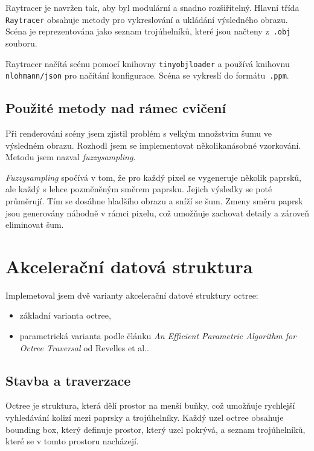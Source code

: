 \documentclass[10pt,a4paper,twocolumn]{article}
\begin{document}
Raytracer je navržen tak, aby byl modulární a snadno rozšiřitelný. Hlavní třída \texttt{Raytracer} obsahuje metody pro vykreslování a ukládání výsledného obrazu. Scéna je reprezentována jako seznam trojúhelníků, které jsou načteny z~\texttt{.obj} souboru.

Raytracer načítá scénu pomocí knihovny \texttt{tinyobjloader} a používá knihovnu \texttt{nlohmann/json} pro načítání konfigurace. Scéna se vykreslí do formátu~\texttt{.ppm}.

\subsection{Použité metody nad rámec cvičení}

Při renderování scény jsem zjistil problém s velkým množstvím šumu ve výsledném obrazu. Rozhodl jsem se implementovat několikanásobné vzorkování. Metodu jsem nazval \textit{fuzzysampling}.

\textit{Fuzzysampling} spočívá v tom, že pro každý pixel se vygeneruje několik paprsků, ale každý s lehce pozměněným směrem paprsku. Jejich výsledky se poté průměrují. Tím se dosáhne hladšího obrazu a sníží se šum. Zmeny směru paprsk jsou generovány náhodně v rámci pixelu, což umožňuje zachovat detaily a zároveň eliminovat šum.


\section{Akcelerační datová struktura}

Implemetoval jsem dvě varianty akcelerační datové struktury octree:
\begin{itemize}
    \item základní varianta octree,
    \item parametrická varianta podle článku \textit{An Efficient Parametric Algorithm for Octree Traversal} od Revelles et al..
\end{itemize}

\subsection{Stavba a traverzace}

Octree je struktura, která dělí prostor na menší buňky, což umožňuje rychlejší vyhledávání kolizí mezi paprsky a trojúhelníky. Každý uzel octree obsahuje bounding box, který definuje prostor, který uzel pokrývá, a seznam trojúhelníků, které se v tomto prostoru nacházejí.
\end{document}
